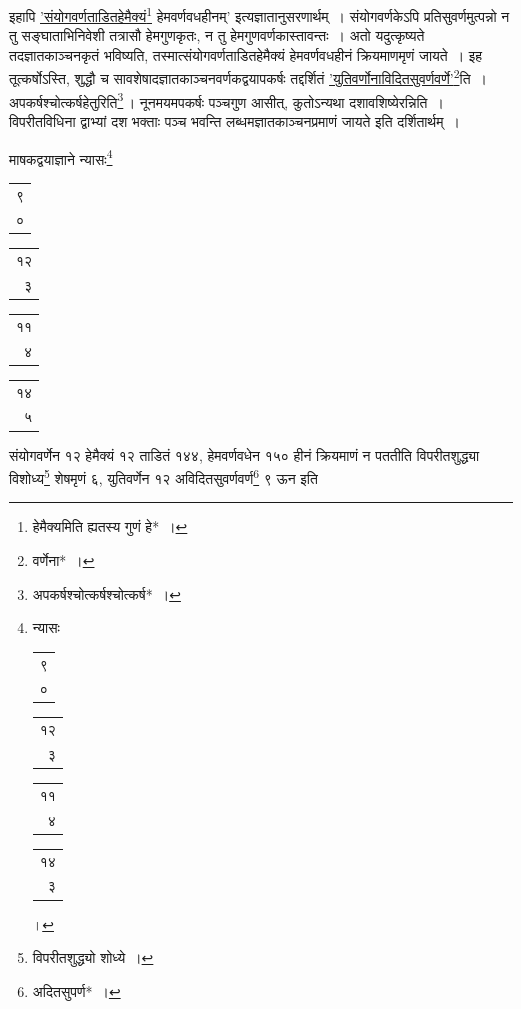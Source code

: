 \documentclass[10pt, openany]{book}
\begin{document}
{{{इहापि \hyperref[55]{'संयोगवर्णताडितहेमैक्यं\renewcommand{\thefootnote}{\s ५}\footnote{\s *हेमैक्यमिति ह्यतस्य गुणं हे*~।} हेमवर्णवधहीनम्'} इत्यज्ञातानुसरणार्थम्~। संयोगवर्णकेऽपि}
{प्रतिसुवर्णमुत्पन्नो न तु सङ्घाताभिनिवेशी तत्रासौ हेमगुणकृतः, न तु
हेमगुणवर्णकास्तावन्तः~।}
{अतो यदुत्कृष्यते तदज्ञातकाञ्चनकृतं भविष्यति,
तस्मात्संयोगवर्णताडितहेमैक्यं हेमवर्णवधहीनं}
{क्रियमाणमृणं जायते~। इह तूत्कर्षोऽस्ति, शुद्धौ च
सावशेषादज्ञातकाञ्चनवर्णकद्वयापकर्षः तद्दर्शितं}
{\hyperref[55]{'युतिवर्णोनाविदितसुवर्णवर्णे'}\renewcommand{\thefootnote}{\s ६}\footnote{\s *वर्णेना*~।}ति~। अपकर्षश्चोत्कर्षहेतुरिति\renewcommand{\thefootnote}{\s ७}\footnote{\s अपकर्षश्चोत्कर्षश्चोत्कर्ष*~।}\,।
नूनमयमपकर्षः पञ्चगुण आसीत्,}
{कुतोऽन्यथा दशावशिष्येरन्निति~। विपरीतविधिना द्वाभ्यां दश भक्ताः पञ्च
भवन्ति लब्धमज्ञातकाञ्चनप्रमाणं जायते इति दर्शितार्थम्~।}
\vspace{3mm}

{माषकद्वयाज्ञाने न्यासः\renewcommand{\thefootnote}{\s ८}\footnote{\s न्यासः\textendash \begin{tabular}{r|}९\\ ०\end{tabular}\begin{tabular}{r|}१२\\ ३\end{tabular}\begin{tabular}{r|}११\\ ४\end{tabular}\begin{tabular}{r}१४\\ ३\end{tabular}।}\textendash \,\begin{tabular}{r|}९\\ ०\end{tabular}\begin{tabular}{r|}१२\\ ३\end{tabular}\begin{tabular}{r|}११\\ ४\end{tabular}\begin{tabular}{r|}१४\\ ५\end{tabular}}
\vspace{3mm}

{संयोगवर्णेन १२ हेमैक्यं १२ ताडितं १४४, हेमवर्णवधेन १५० हीनं क्रियमाणं
न}
{पततीति विपरीतशुद्ध्या विशोध्य\renewcommand{\thefootnote}{\s ९}\footnote{\s विपरीतशुद्ध्यो शोध्ये~।}  शेषमृणं ६, युतिवर्णेन १२
अविदितसुवर्णवर्ण\renewcommand{\thefootnote}{\s १०}\footnote{\s अदितसुपर्ण*~।}  ९ ऊन इति}

}}
\end{document}

